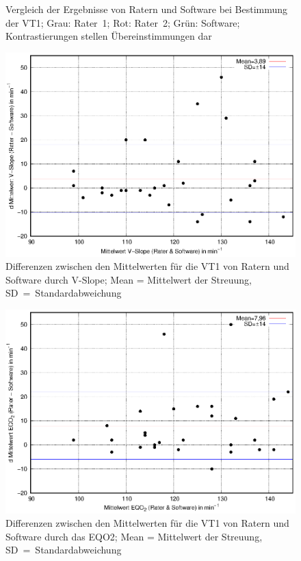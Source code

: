 \begin{figure}[H]
\begin{subfigure}[c]{0.45\textwidth}
			\label{subpic:pic2}
	\end{subfigure}
\caption[Grafischer Vergleich der Ergebnisse für die VT1]{Vergleich der Ergebnisse von Ratern und Software bei Bestimmung der VT1; Grau: Rater~1; Rot: Rater~2; Grün: Software; Kontrastierungen stellen Übereinstimmungen dar}
\label{pic:pic22}
\end{figure}
%
\begin{figure}[H]
	\centering
	\includegraphics[scale=0.95]{Bilder/vslope.eps}
	\caption[Differenzen der V-Slope-Ergebnisse zwischen Ratern und Software]{Differenzen zwischen den Mittelwerten für die VT1 von Ratern und Software durch V-Slope; Mean = Mittelwert der Streuung, SD~=~Standardabweichung}
	\label{pic:pic23}
\end{figure}
%
\begin{figure}[H]
	\centering
	\includegraphics[scale=0.95]{Bilder/eqo2.eps}
	\caption[Differenzen der \acrshort{EQO2}-Ergebnisse zwischen Ratern und Software]{Differenzen zwischen den Mittelwerten für die VT1 von Ratern und Software durch das \acrshort{EQO2}; Mean = Mittelwert der Streuung, SD~=~Standardabweichung}
	\label{pic:pic24}
\end{figure}
